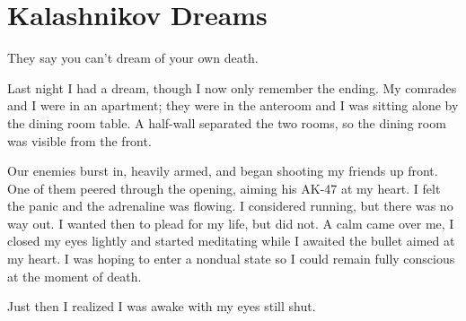 \section{Kalashnikov Dreams}

\begin{quotex}
They say you can't dream of your own death.
\end{quotex}


Last night I had a dream, though I now only remember the ending. My comrades and I were in an apartment; they were in the anteroom and I was sitting alone by the dining room table. A half-wall separated the two rooms, so the dining room was visible from the front.

Our enemies burst in, heavily armed, and began shooting my friends up front. One of them peered through the opening, aiming his AK-47 at my heart. I felt the panic and the adrenaline was flowing. I considered running, but there was no way out. I wanted then to plead for my life, but did not. A calm came over me, I closed my eyes lightly and started meditating while I awaited the bullet aimed at my heart. I was hoping to enter a nondual state so I could remain fully conscious at the moment of death.

Just then I realized I was awake with my eyes still shut.



